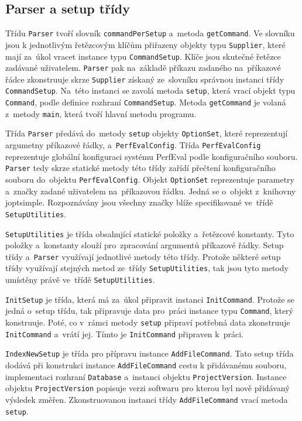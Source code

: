 \subsection{Parser a setup třídy}

Třídu \lstinline{Parser} tvoří slovník \lstinline{commandPerSetup} a~metoda \lstinline{getCommand}.
Ve slovníku jsou k jednotlivým řetězcovým klíčům přiřazeny objekty typu
\lstinline{Supplier}, které mají za~úkol vracet instance typu \lstinline{CommandSetup}.
Klíče jsou skutečné řetězce zadávané uživatelem. \lstinline{Parser} pak na~základě příkazu
zadaného na~příkazové řádce zkonstruuje skrze \lstinline{Supplier} získaný ze~slovníku správnou
instanci třídy \lstinline{CommandSetup}. Na~této instanci se zavolá metoda \lstinline{setup}, která vrací
objekt typu \lstinline{Command}, podle definice rozhraní \lstinline{CommandSetup}. Metoda \lstinline{getCommand} je volaná
z~metody \lstinline{main}, která tvoří hlavní metodu programu.

Třída \lstinline{Parser} předává do~metody \lstinline{setup} objekty \lstinline{OptionSet}, které reprezentují argumetny příkazové řádky,
a~\lstinline{PerfEvalConfig}. Třída \lstinline{PerfEvalConfig}
reprezentuje globální konfiguraci systému PerfEval podle konfiguračního souboru.
\lstinline{Parser} tedy skrze statické metody této třídy zařídí přečtení konfiguračního souboru
do~objektu \lstinline{PerfEvalConfig}. Objekt \lstinline{OptionSet} reprezentuje parametry a~značky zadané
uživatelem na~příkazovou řádku. Jedná se o~objekt z~knihovny joptsimple. Rozpoznávány jsou
všechny značky blíže specifikované ve~třídě \lstinline{SetupUtilities}.

\lstinline{SetupUtilities} je třída obsahující statické položky a~řetězcové konstanty.
Tyto položky a~konstanty slouží pro~zpracování argumentů příkazové řádky.
Setup třídy a~\lstinline{Parser} využívají jednotlivé metody této třídy.
Protože některé setup třídy využívají stejných metod ze~třídy \lstinline{SetupUtilities}, tak jsou tyto metody umístěny
právě ve~třídě \lstinline{SetupUtilities}.

\lstinline{InitSetup} je třída, která má za~úkol připravit instanci \lstinline{InitCommand}. Protože se jedná
o~setup třídu, tak připravuje data pro~práci instance typu \lstinline{Command}, který konstruuje. Poté, co v~rámci
metody \lstinline{setup} připraví potřebná data zkonstruuje \lstinline{InitCommand} a~vrátí jej.
Tímto je \lstinline{InitCommand} připraven k~práci.

\lstinline{IndexNewSetup} je třída pro přípravu instance \lstinline{AddFileCommand}. Tato setup třída dodává
při konstrukci instance \lstinline{AddFileCommand} cestu k přidávanému souboru, implementaci rozhraní \lstinline{Database}
a~instanci objektu \lstinline{ProjectVersion}. Instance objektu \lstinline{ProjectVersion} popisuje verzi softwaru pro kterou
byl nově přidávaný výsledek změřen. Zkonstruovanou instanci třídy \lstinline{AddFileCommand} vrací metoda \lstinline{setup}.

